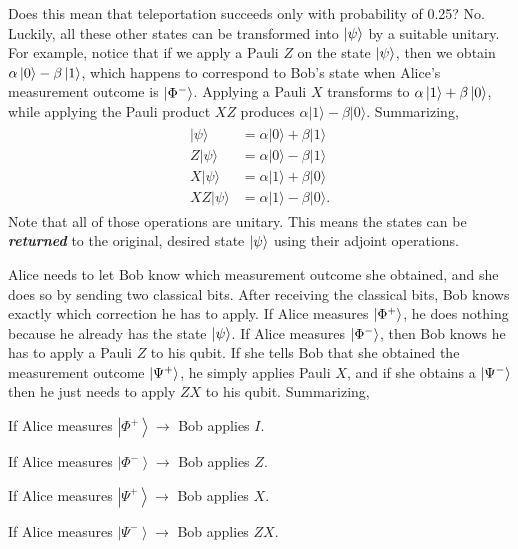 Does this mean that teleportation succeeds only with probability of 0.25?
No.
Luckily, all these other states can be transformed into $\left| \psi \right\rangle$ by a suitable unitary.
For example, notice that if we apply a Pauli $Z$ on the state $\left| \psi \right\rangle$, then we obtain $\alpha\left| 0 \right\rangle-\beta\left| 1 \right\rangle$, which happens to correspond to Bob's state when Alice's measurement outcome is $\left| \Phi^- \right\rangle$.
Applying a Pauli $X$ transforms \ket{\psi} to $\alpha\left| 1 \right\rangle+\beta\left| 0 \right\rangle$, while applying the Pauli product $XZ$ produces $\alpha|1\rangle-\beta|0\rangle$.
Summarizing,
\begin{align}
\begin{aligned}
    |\psi\rangle &=\alpha|0\rangle+\beta|1\rangle \\
    Z|\psi\rangle &=\alpha|0\rangle-\beta|1\rangle \\
    X|\psi\rangle &=\alpha|1\rangle+\beta|0\rangle \\
    X Z|\psi\rangle &=\alpha|1\rangle-\beta|0\rangle.
\end{aligned}
\end{align}
Note that all of those operations are unitary.  This means the states can be \textbf{\emph{returned}} to the original, desired state $\left| \psi \right\rangle$ using their adjoint operations.

Alice needs to let Bob know which measurement outcome she obtained, and she does so by sending two classical bits.
After receiving the classical bits, Bob knows exactly which correction he has to apply.
If Alice measures $\left| \Phi^+ \right\rangle$, he does nothing because he already has the state $\left| \psi \right\rangle$.
If Alice measures $\left| \Phi^- \right\rangle$, then Bob knows he has to apply a Pauli $Z$ to his qubit.
If she tells Bob that she obtained the measurement outcome $\left| \Psi^+ \right\rangle$, he simply applies Pauli $X$, and if she obtains a $\left| \Psi^- \right\rangle$ then he just needs to apply $ZX$ to his qubit.  Summarizing,

\hspace{2cm} If Alice measures $\left|\Phi^{+}\right\rangle \rightarrow$ Bob applies $I$.

\hspace{2cm} If Alice measures $\left|\Phi^{-}\right\rangle \rightarrow$ Bob applies $Z$.

\hspace{2cm} If Alice measures $\left|\Psi^{+}\right\rangle \rightarrow$ Bob applies $X$.

\hspace{2cm} If Alice measures $\left|\Psi^{-}\right\rangle \rightarrow$ Bob applies $Z X$.

